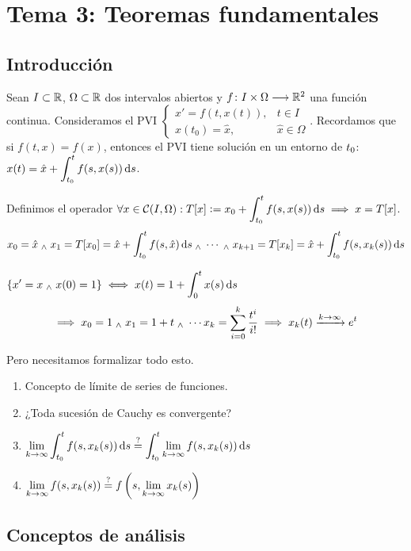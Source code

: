 
\section{Tema 3: Teoremas fundamentales}

\subsection{Introducción}

Sean $I\subset \mathbb{R}$, $\Omega \subset \mathbb{R}$ dos intervalos abiertos y $f \colon I\times \Omega \longrightarrow \mathbb{R}^2$ una función continua. Consideramos el PVI $\begin{cases}
		x'=f(t, x(t)) , & t\in I            \\
		x(t_0)=\hat{x}, & \hat{x}\in \Omega
	\end{cases}$. Recordamos que si $f(t, x)=f(x)$, entonces el PVI tiene solución en un entorno de $\displaystyle t_0$: $\ds x(t) = \hat{x} + \int_{t_0}^{t} f(s, x(s)) \odif{s}$.

Definimos el operador $\ds \forall x \in \mathcal{C}(I, \Omega) : T[x]\defeq x_0 + \int_{t_0}^{t} f(s, x(s)) \odif{s} \implies x=T[x]$.
\[x_0 = \hat{x} \we x_1 = T[x_0] = \hat{x} + \int_{t_0}^{t} f(s, \hat{x}) \odif{s} \we \cdots \we x_{k+1} = T[x_k]= \hat{x} + \int_{t_0}^{t} f(s, x_k(s)) \odif{s}\]
\begin{ejem}
	$\ds\{x'=x \we x(0)=1\} \iff x(t)=1+\int_{0}^{t} x(s) \odif{s}$
	\[\implies x_0 = 1 \; _{\wedge} \; x_1 = 1 + t \; _{\wedge} \; \cdots x_k = \sum_{i=0}^{k} \frac{t^i}{i!} \implies x_k(t)\xrightarrow{k\to\infty} e^t\]
\end{ejem}

Pero necesitamos formalizar todo esto.
\begin{enumerate}
	\item Concepto de límite de series de funciones.
	\item ¿Toda sucesión de Cauchy es convergente?
	\item $\ds \lim_{k\to\infty} \int_{t_0}^t f(s, x_k(s)) \odif{s} \stackrel{?}{=} \int_{t_0}^t \lim_{k\to\infty} f(s, x_k(s)) \odif{s}$
	\item $\displaystyle \lim_{k\to\infty} f(s, x_k(s)) \stackrel{?}{=} f\left(s, \lim_{k\to\infty} x_k(s)\right)$
\end{enumerate}

\subsection{Conceptos de análisis}
